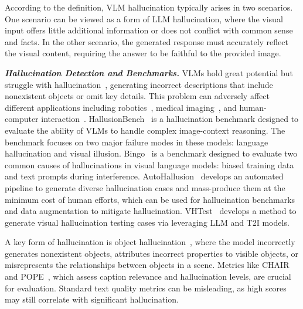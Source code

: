 According to the definition, VLM hallucination typically arises in two scenarios. One scenario can be viewed as a form of LLM hallucination, where the visual input offers little additional information or does not conflict with common sense and facts. In the other scenario, the generated response must accurately reflect the visual content, requiring the answer to be faithful to the provided image.

\textbf{\textit{Hallucination Detection and Benchmarks.}}
VLMs hold great potential but struggle with hallucination~\cite{HallusionBench, cui2023holistic, Zhang2023SirensSI, Li2023EvaluatingOH}, generating incorrect descriptions that include nonexistent objects or omit key details. This problem can adversely affect different applications including robotics~\cite{wu2024safety,liu2023llm, guan2024loczson}, medical imaging~\cite{wang2023chatcad,hu2023advancing}, and human-computer interaction~\cite{brie2023evaluating}. 
HallusionBench~\cite{HallusionBench} is a hallucination benchmark designed to evaluate the ability of VLMs to handle complex image-context reasoning. The benchmark focuses on two major failure modes in these models: language hallucination and visual illusion.
Bingo~\cite{cui2023holistic} is a benchmark designed to evaluate two common causes of hallucinations in visual language models: biased training data and text prompts during interference. 
AutoHallusion~\cite{AutoHallusion} develops an automated pipeline to generate diverse hallucination cases and mass-produce them at the minimum cost of human efforts, which can be used for hallucination benchmarks and data augmentation to mitigate hallucination. VHTest~\cite{huang2024visual} develops a method to generate visual hallucination testing cases via leveraging LLM and T2I models. 

A key form of hallucination is object hallucination~\cite{gunjal2024detecting, zhai2023halle, zhou2024analyzing}, where the model incorrectly generates nonexistent objects, attributes incorrect properties to visible objects, or misrepresents the relationships between objects in a scene. 
Metrics like CHAIR~\cite{rohrbach2018object} and POPE~\cite{li2023evaluating}, which assess caption relevance and hallucination levels, are crucial for evaluation. Standard text quality metrics can be misleading, as high scores may still correlate with significant hallucination.




